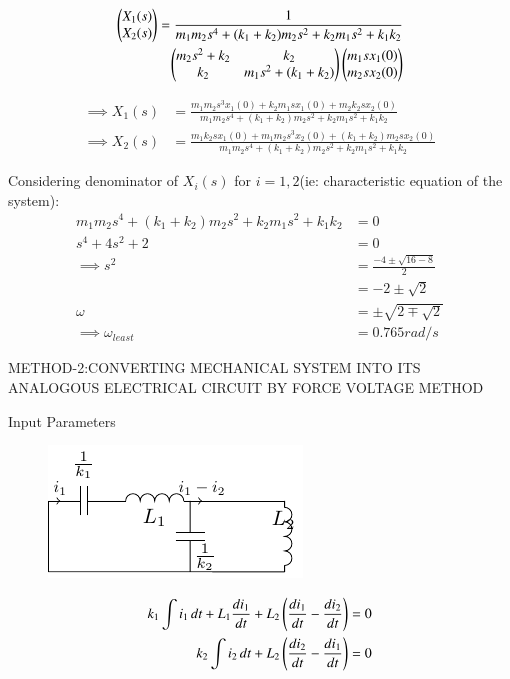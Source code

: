 \documentclass[journal,12pt,twocolumn]{IEEEtran}
\theoremstyle{remark}
\begin{document}
\begin{align}
\begin{pmatrix}
X_1(s) \\
X_2(s)
\end{pmatrix}
= \frac{1}{m_1m_2s^4+(k_1+k_2)m_2s^2+k_2m_1s^2+k_1k_2} \nonumber \\
\begin{pmatrix}
m_2s^2+k_2 & k_2  \\
k_2& m_1s^2+(k_1+k_2)
\end{pmatrix}
\begin{pmatrix}
m_1sx_1(0) \\
m_2sx_2(0)
\end{pmatrix}
\end{align}

\begin{align}
\implies X_1(s)&=\frac{m_1m_2s^3x_1(0)+k_2m_1sx_1(0)+m_2k_2sx_2(0)}{m_1m_2s^4+(k_1+k_2)m_2s^2+k_2m_1s^2+k_1k_2} \\
\implies X_2(s)&=\frac{m_1k_2sx_1(0)+m_1m_2s^3x_2(0)+(k_1+k_2)m_2sx_2(0)}{m_1m_2s^4+(k_1+k_2)m_2s^2+k_2m_1s^2+k_1k_2}
\end{align}

Considering denominator of $X_i(s)$ for $i=1,2$(ie: characteristic equation of the system):
\begin{align}
m_1m_2s^4+(k_1+k_2)m_2s^2+k_2m_1s^2+k_1k_2 &=0 \\
s^4 +4s^2+2&=0\\
\implies s^2&=\frac{-4\pm \sqrt{16-8}}{2} \\
&= -2 \pm \sqrt{2} \\
\omega&=\pm\sqrt{2\mp \sqrt{2}}\\
\implies \omega_{least} &= 0.765 rad/s
\end{align} 


METHOD-2:CONVERTING MECHANICAL SYSTEM INTO ITS ANALOGOUS ELECTRICAL CIRCUIT BY FORCE VOLTAGE METHOD


\begin{table}[!ht]    
    \centering
    \resizebox{9cm}{2cm}{
         
    }
    \caption{Input Parameters}
    \label{table:ishitha.g22.nm.54.t2}
\end{table}

\begin{figure}[!ht]
    \centering
    \includegraphics[width=\columnwidth]{figs/tikz.pdf}
    \caption{ }
    \label{fig:ishitha.g22.nm.54.f3}
\end{figure}   
\begin{align}
 k_1\int i_1 \, dt + L_1\frac{di_1}{dt}+L_2\left(\frac{di_1}{dt}-\frac{di_2}{dt}\right)&=0
\label{eq:ishitha.g22.nm.54.5.eq} \\
k_2\int i_2 \, dt + L_2\left(\frac{di_2}{dt}-\frac{di_1}{dt}\right)&=0
\label{eq:ishitha.g22.nm.54.6.eq} 
\end{align}
\end{document}
